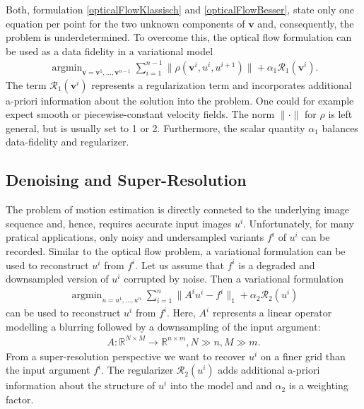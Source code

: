 \documentclass[final,leqno,onefignum,onetabnum]{article}
\newcommand{\R}{\mathbb{R}}
\newcommand{\1}[1]{\mathds{1}_{#1}}
\DeclareMathOperator*{\argmin}{\arg \min}%
\begin{document}
Both, formulation \eqref{opticalFlowKlassisch} and \eqref{opticalFlowBesser}, state only one equation per point for the two unknown components of $\boldsymbol{v}$ and, consequently, the problem is underdetermined. To overcome this, the optical flow formulation can be used as a data fidelity in a variational model
\begin{align}
	\argmin_{\boldsymbol{v} = \boldsymbol{v}^1,\ldots, \boldsymbol{v}^{n-1}} \sum_{i=1}^{n-1} \| \rho(\boldsymbol{v}^i,u^{i},u^{i+1}) \| + \alpha_1 \mathcal{R}_1(\boldsymbol{v}^i).
	\label{variationalMotionModelGeneral}
\end{align}
The term $\mathcal{R}_1(\boldsymbol{v}^i)$ represents a regularization term and incorporates additional a-priori information about the solution into the problem. One could for example expect smooth or piecewise-constant velocity fields. The norm $\|\cdot\|$ for $\rho$ is left general, but is usually set to 1 or 2. Furthermore, the scalar quantity $\alpha_1$ balances data-fidelity and regularizer.

\subsection{Denoising and Super-Resolution}
The problem of motion estimation is directly conneted to the underlying image sequence and, hence, requires accurate input images $u^i$. Unfortunately, for many pratical applications, only noisy and undersampled variants $f^i$ of $u^i$ can be recorded. Similar to the optical flow problem, a variational formulation can be used to reconstruct $u^i$ from $f^i$. Let us assume that $f^i$ is a degraded and downsampled version of $u^i$ corrupted by noise. Then a variational formulation
\begin{align}
	\argmin_{u = u^1,\ldots, u^{n}} \sum_{i=1}^{n} \|A^iu^i-f^i \|_1 + \alpha_2 \mathcal{R}_2(u^i)
	\label{variationalDenoisingModelGeneral}
\end{align}
can be used to reconstruct $u^i$ from $f^i$. Here, $A^i$ represents a linear operator modelling a blurring followed by a downsampling of the input argument: 
\begin{align*}
	A:\R^{N\times M}\rightarrow \R^{n\times m}, N\gg n, M\gg m.
\end{align*}
From a super-resolution perspective we want to recover $u^i$ on a finer grid than the input argument $f^i$. The regularizer $\mathcal{R}_2(u^i)$ adds additional a-priori information about the structure of $u^i$ into the model and and $\alpha_2$ is a weighting factor.\\
\end{document}
